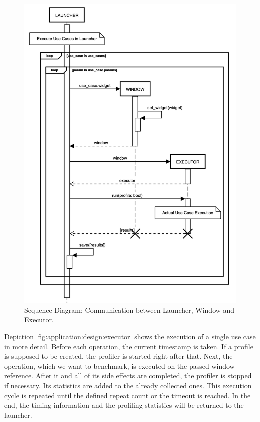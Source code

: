 \begin{figure}[h]
    \centering
    \includegraphics[width=12cm]{resources/img/sequence/launcher}
    \caption{
        Sequence Diagram: Communication between Launcher, Window and Executor.
    }
    \label{fig:application:design:launcher}
\end{figure}

Depiction \ref{fig:application:design:executor} shows the execution of a single
use case in more detail. Before each operation, the current timestamp is taken.
If a profile is supposed to be created, the profiler is started right after
that. Next, the operation, which we want to benchmark, is executed on the passed
window reference. After it and all of its side effects are completed, the
profiler is stopped if necessary. Its statistics are added to the already
collected ones. This execution cycle is repeated until the defined repeat count
or the timeout is reached. In the end, the timing information and the profiling
statistics will be returned to the launcher.

